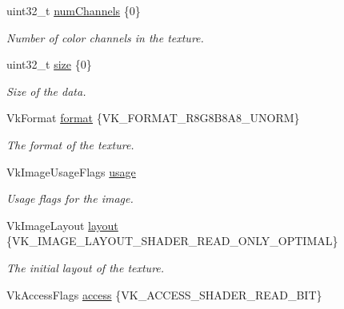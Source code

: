 \begin{DoxyCompactItemize}
uint32\+\_\+t \hyperlink{structblaze_1_1ImageData2D_ac2f2933e59ead303532fffd599754bf0}{num\+Channels} \{0\}
\begin{DoxyCompactList}\small\item\em Number of color channels in the texture. \end{DoxyCompactList}\item 
\mbox{\label{structblaze_1_1ImageData2D_a8b587c47ec094837488f11a8dc8790a9}} 
uint32\+\_\+t \hyperlink{structblaze_1_1ImageData2D_a8b587c47ec094837488f11a8dc8790a9}{size} \{0\}
\begin{DoxyCompactList}\small\item\em Size of the data. \end{DoxyCompactList}\item 
\mbox{\label{structblaze_1_1ImageData2D_a9a1572957c79a07a9c8d13e826161286}} 
Vk\+Format \hyperlink{structblaze_1_1ImageData2D_a9a1572957c79a07a9c8d13e826161286}{format} \{V\+K\+\_\+\+F\+O\+R\+M\+A\+T\+\_\+\+R8\+G8\+B8\+A8\+\_\+\+U\+N\+O\+RM\}
\begin{DoxyCompactList}\small\item\em The format of the texture. \end{DoxyCompactList}\item 
Vk\+Image\+Usage\+Flags \hyperlink{structblaze_1_1ImageData2D_ad6199a1532afd652fd5304805b820715}{usage}
\begin{DoxyCompactList}\small\item\em Usage flags for the image. \end{DoxyCompactList}\item 
\mbox{\label{structblaze_1_1ImageData2D_a3c44f9da5b0648380406f63f7b6861cb}} 
Vk\+Image\+Layout \hyperlink{structblaze_1_1ImageData2D_a3c44f9da5b0648380406f63f7b6861cb}{layout} \{V\+K\+\_\+\+I\+M\+A\+G\+E\+\_\+\+L\+A\+Y\+O\+U\+T\+\_\+\+S\+H\+A\+D\+E\+R\+\_\+\+R\+E\+A\+D\+\_\+\+O\+N\+L\+Y\+\_\+\+O\+P\+T\+I\+M\+AL\}
\begin{DoxyCompactList}\small\item\em The initial layout of the texture. \end{DoxyCompactList}\item 
\mbox{\label{structblaze_1_1ImageData2D_ae2f3bea64271aedbb1c1cec21cb1f39b}} 
Vk\+Access\+Flags \hyperlink{structblaze_1_1ImageData2D_ae2f3bea64271aedbb1c1cec21cb1f39b}{access} \{V\+K\+\_\+\+A\+C\+C\+E\+S\+S\+\_\+\+S\+H\+A\+D\+E\+R\+\_\+\+R\+E\+A\+D\+\_\+\+B\+IT\}

\end{DoxyCompactItemize}
